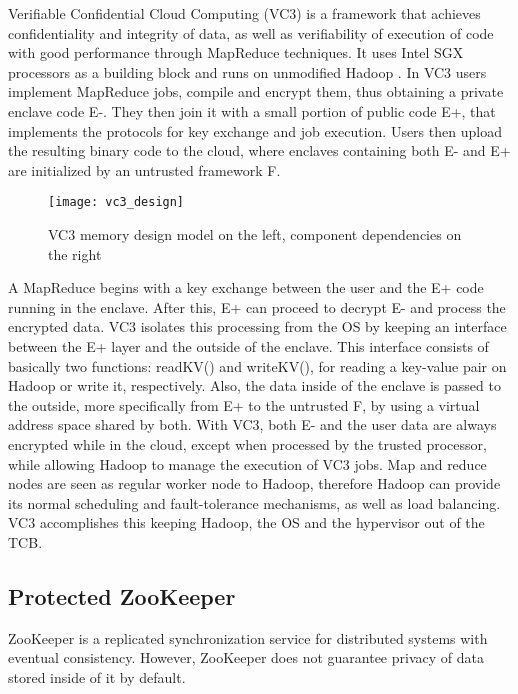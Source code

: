 \begin{itemize}
Verifiable Confidential Cloud Computing (VC3) \cite{vc3Paper} is a framework that achieves confidentiality and integrity of data, as well as verifiability of execution of code with good performance through MapReduce \cite{mapReduce} techniques. It uses Intel SGX processors as a building block and runs on unmodified Hadoop \cite{hadoop}.
In VC3 users implement MapReduce jobs, compile and encrypt them, thus obtaining a private enclave code E-. They then join it with a small portion of public code E+, that implements the protocols for key exchange and job execution.
Users then upload the resulting binary code to the cloud, where enclaves containing both E- and E+ are initialized by an untrusted framework F. 

\begin{figure}[htbp]
	\centering
	{\texttt{[image: vc3\_design]}}%
	\caption{VC3 memory design model on the left, component dependencies on the right}
\end{figure}

A MapReduce begins with a key exchange between the user and the E+ code running in the enclave. After this, E+ can proceed to decrypt E- and process the encrypted data. VC3 isolates this processing from the OS by keeping an interface between the E+ layer and the outside of the enclave. This interface consists of basically two functions: readKV() and writeKV(), for reading a key-value pair on Hadoop or write it, respectively. Also, the data inside of the enclave is passed to the outside, more specifically from E+ to the untrusted F, by using a virtual address space shared by both.
With VC3, both E- and the user data are always encrypted while in the cloud, except when processed by the trusted processor, while allowing Hadoop to manage the execution of VC3 jobs. Map and reduce nodes are seen as regular worker node to Hadoop, therefore Hadoop can provide its normal scheduling and fault-tolerance mechanisms, as well as load balancing. VC3 accomplishes this keeping Hadoop, the OS and the hypervisor out of the TCB.




\subsection{Protected ZooKeeper}

ZooKeeper \cite{zookeeper} is a replicated synchronization service for distributed systems with eventual consistency. However, ZooKeeper does not guarantee privacy of data stored inside of it by default.
 

\end{itemize}
